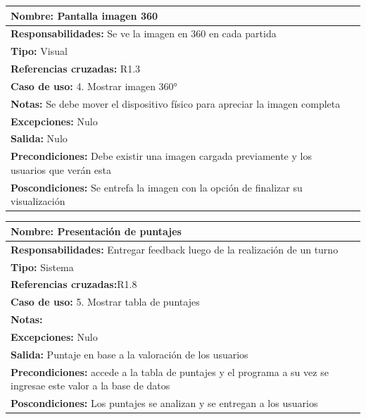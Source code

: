 \begin{table}[H]
    \begin{center}
        \begin{tabular}{| l | m{12cm} |}       
        	\hline 
        	\textbf{Nombre:} Pantalla imagen 360\\
        	\hline
        	\textbf{Responsabilidades:} Se ve la imagen en 360 en cada partida \\
        	\hline
        	\textbf{Tipo:} Visual\\
        	\hline
        	\textbf{Referencias cruzadas:} R1.3\\
        	\hline
        	\textbf{Caso de uso:} 4. Mostrar imagen 360°\\
        	\hline
        	\textbf{Notas:} Se debe mover el dispositivo físico para apreciar la imagen completa\\
        	\hline
        	\textbf{Excepciones:} Nulo \\
        	\hline
        	\textbf{Salida:} Nulo \\
        	\hline
        	\textbf{Precondiciones:} Debe existir una imagen cargada previamente y los usuarios que verán esta \\
        	\hline
        	\textbf{Poscondiciones:} Se entrefa la imagen con la opción de finalizar su visualización\\
        	\hline
        \end{tabular}
    \end{center}
\end{table}

\begin{table}[H]
    \begin{center}
        \begin{tabular}{| l | m{12cm} |}        
        	\hline 
        	\textbf{Nombre:} Presentación de puntajes \\
        	\hline
        	\textbf{Responsabilidades: }Entregar feedback luego de la realización de un turno \\
        	\hline
        	\textbf{Tipo:} Sistema \\
        	\hline
        	\textbf{Referencias cruzadas:}R1.8 \\
        	\hline
        	\textbf{Caso de uso:} 5. Mostrar tabla de puntajes\\
        	\hline
        	\textbf{Notas:} \\
        	\hline
        	\textbf{Excepciones:} Nulo \\
        	\hline
        	\textbf{Salida:} Puntaje en base a la valoración de los usuarios\\
        	\hline
        	\textbf{Precondiciones:}  accede a la tabla de puntajes y el programa a su vez se ingresae este valor a la base de datos \\
        	\hline
        	\textbf{Poscondiciones:} Los puntajes se analizan y se entregan a los usuarios\\
        	\hline
        \end{tabular}
    \end{center}
\end{table}

